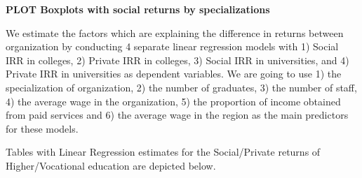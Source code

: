 \documentclass[alpha-refs]{wiley-article-05g}
\begin{document}
\textbf{PLOT Boxplots with social returns by specializations}

We estimate the factors which are explaining the difference in returns between organization by conducting 4 separate linear regression models with 1) Social IRR in colleges, 2) Private IRR in colleges, 3) Social IRR in universities, and 4) Private IRR in universities as dependent variables. We are going to use 1) the specialization of organization, 2) the number of graduates, 3) the number of staff, 4) the average wage in the organization, 5) the proportion of income obtained from paid services and 6) the average wage in the region as the main predictors for these models.

Tables with Linear Regression estimates for the Social/Private returns of Higher/Vocational education are depicted below.
\end{document}
